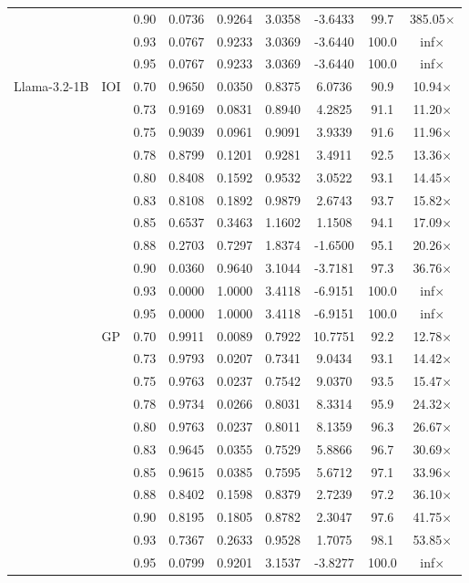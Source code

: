 \begin{table}[ht]
{\begin{tabular}{lll|cccc|cc}
 &  & 0.90 & 0.0736 & 0.9264 & 3.0358 & -3.6433 & 99.7 & 385.05$\times$ \\
 &  & 0.93 & 0.0767 & 0.9233 & 3.0369 & -3.6440 & 100.0 & inf$\times$ \\
 &  & 0.95 & 0.0767 & 0.9233 & 3.0369 & -3.6440 & 100.0 & inf$\times$ \\
\midrule
Llama-3.2-1B & IOI & 0.70 & 0.9650 & 0.0350 & 0.8375 & 6.0736 & 90.9 & 10.94$\times$ \\
 &  & 0.73 & 0.9169 & 0.0831 & 0.8940 & 4.2825 & 91.1 & 11.20$\times$ \\
 &  & 0.75 & 0.9039 & 0.0961 & 0.9091 & 3.9339 & 91.6 & 11.96$\times$ \\
 &  & 0.78 & 0.8799 & 0.1201 & 0.9281 & 3.4911 & 92.5 & 13.36$\times$ \\
 &  & 0.80 & 0.8408 & 0.1592 & 0.9532 & 3.0522 & 93.1 & 14.45$\times$ \\
 &  & 0.83 & 0.8108 & 0.1892 & 0.9879 & 2.6743 & 93.7 & 15.82$\times$ \\
 &  & 0.85 & 0.6537 & 0.3463 & 1.1602 & 1.1508 & 94.1 & 17.09$\times$ \\
 &  & 0.88 & 0.2703 & 0.7297 & 1.8374 & -1.6500 & 95.1 & 20.26$\times$ \\
 &  & 0.90 & 0.0360 & 0.9640 & 3.1044 & -3.7181 & 97.3 & 36.76$\times$ \\
 &  & 0.93 & 0.0000 & 1.0000 & 3.4118 & -6.9151 & 100.0 & inf$\times$ \\
 &  & 0.95 & 0.0000 & 1.0000 & 3.4118 & -6.9151 & 100.0 & inf$\times$ \\
\midrule
 & GP & 0.70 & 0.9911 & 0.0089 & 0.7922 & 10.7751 & 92.2 & 12.78$\times$ \\
 &  & 0.73 & 0.9793 & 0.0207 & 0.7341 & 9.0434 & 93.1 & 14.42$\times$ \\
 &  & 0.75 & 0.9763 & 0.0237 & 0.7542 & 9.0370 & 93.5 & 15.47$\times$ \\
 &  & 0.78 & 0.9734 & 0.0266 & 0.8031 & 8.3314 & 95.9 & 24.32$\times$ \\
 &  & 0.80 & 0.9763 & 0.0237 & 0.8011 & 8.1359 & 96.3 & 26.67$\times$ \\
 &  & 0.83 & 0.9645 & 0.0355 & 0.7529 & 5.8866 & 96.7 & 30.69$\times$ \\
 &  & 0.85 & 0.9615 & 0.0385 & 0.7595 & 5.6712 & 97.1 & 33.96$\times$ \\
 &  & 0.88 & 0.8402 & 0.1598 & 0.8379 & 2.7239 & 97.2 & 36.10$\times$ \\
 &  & 0.90 & 0.8195 & 0.1805 & 0.8782 & 2.3047 & 97.6 & 41.75$\times$ \\
 &  & 0.93 & 0.7367 & 0.2633 & 0.9528 & 1.7075 & 98.1 & 53.85$\times$ \\
 &  & 0.95 & 0.0799 & 0.9201 & 3.1537 & -3.8277 & 100.0 & inf$\times$ \\
\bottomrule
\end{tabular}}
\end{table}